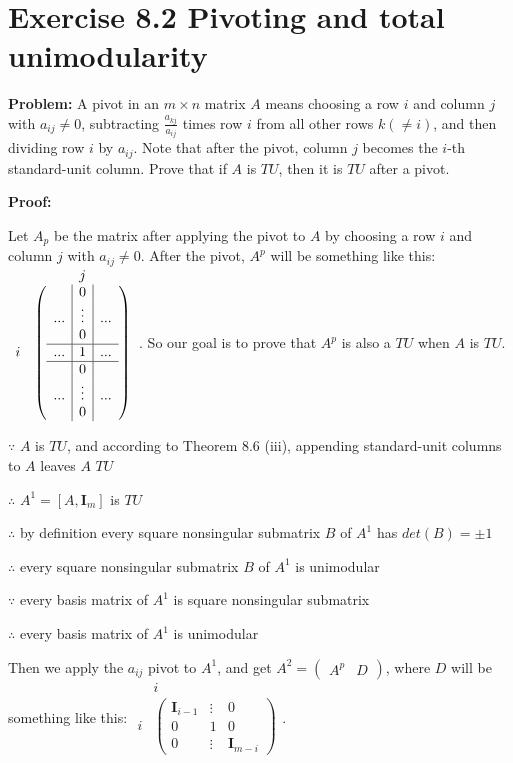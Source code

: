 \section{Exercise 8.2 Pivoting and total unimodularity}
\textbf{Problem:} A pivot in an $m\times{}n$ matrix $A$ means choosing a row $i$ and column $j$ with $a_{ij}\neq{}0$, subtracting $\frac{a_{kj}}{a_{ij}}$ times row $i$ from all other rows $k(\neq{}i)$, and then dividing row $i$ by $a_{ij}$. Note that after the pivot, column $j$ becomes the $i$-th standard-unit column. Prove that if $A$ is $TU$, then it is $TU$ after a pivot.

\textbf{Proof:} 

Let $A_p$ be the matrix after applying the pivot to $A$ by choosing a row $i$ and column $j$ with $a_{ij}\neq{}0$. After the pivot, $A^p$ will be something like this:
$\begin{array}{cc} & j \\ i &  \left( \begin{array}{c|c|c}   & 0 & \\  ... & \vdots & ... \\   & 0 &  \\ \hline  ... & 1 & ... \\ \hline  & 0 &  \\  ... & \vdots & ... \\   & 0 &  \\
\end{array} \right)  \end{array}$. So our goal is to prove that $A^p$ is also a $TU$ when $A$ is $TU$.

$\because$ $A$ is $TU$, and according to Theorem 8.6 (iii), appending standard-unit columns to $A$ leaves $A$ $TU$

$\therefore$ $A^1=[A,\textbf{I}_m]$ is $TU$

$\therefore$ by definition every square nonsingular submatrix $B$ of $A^1$ has $det(B)=\pm1$

$\therefore$ every square nonsingular submatrix $B$ of $A^1$ is unimodular

$\because$ every basis matrix of $A^1$ is square nonsingular submatrix

$\therefore$ every basis matrix of $A^1$ is unimodular

Then we apply the $a_{ij}$ pivot to $A^1$, and get $A^2=\left( \begin{array}{cc} A^p & D \end{array}\right)$, where $D$ will be something like this: $\begin{array}{cc} & i \\ i &  \left( \begin{array}{c|c|c} \textbf{I}_{i-1} & \vdots & 0 \\  \hline  0 & 1 & 0 \\ \hline  0 & \vdots & \textbf{I}_{m-i} \end{array} \right)  \end{array}$.

